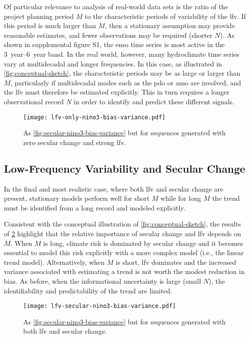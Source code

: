 \documentclass[
  draft,
  linenumbers
]{agujournal2019}
\begin{document}
Of particular relevance to analysis of real-world data sets is the ratio of the project planning period $M$ to the characteristic periods of variability of the \gls{lfv}.
If this period is much larger than $M$, then a stationary assumption may provide reasonable estimates, and fewer observations may be required (shorter $N$).
As shown in supplemental figure S1, the \gls{enso} time series is most active in the \SIrange{3}{6}{year} band.
In the real world, however, many hydroclimate time series vary at multidecadal and longer frequencies.
In this case, as illustrated in \cref{fig:conceptual-sketch}, the characteristic periods may be as large or larger than $M$, particularly if multidecadal modes such as the \gls{pdo} or \gls{amo} are involved, and the \gls{lfv} must therefore be estimated explicitly.
This in turn requires a longer observational record $N$ in order to identify and predict these different signals.

\begin{figure}
  \centering
  \texttt{[image: lfv-only-nino3-bias-variance.pdf]}
  \caption{
    As \cref{fig:secular-nino3-bias-variance} but for sequences generated with zero secular change and strong \gls{lfv}.
  }\label{fig:lfv-nino3-bias-variance}
\end{figure}

\subsection{Low-Frequency Variability and Secular Change}

In the final and most realistic case, where both \gls{lfv} and secular change are present, stationary models perform well for short $M$ while for long $M$ the trend must be identified from a long record and modeled explicitly.

Consistent with the conceptual illustration of \cref{fig:conceptual-sketch}, the results of \cref{fig:lfv-secular-nino3-bias-variance} highlight that the relative importance of secular change and \gls{lfv} depends on $M$.
When $M$ is long, climate risk is dominated by secular change and it becomes essential to model this risk explicitly with a more complex model (i.e.\@\xspace, the linear trend model).
Alternatively, when $M$ is short, \gls{lfv} dominates and the increased variance associated with estimating a trend is not worth the modest reduction in bias.
As before, when the informational uncertainty is large (small $N$), the identifiability and predictability of the trend are  limited.
\begin{figure}
  \centering
  \texttt{[image: lfv-secular-nino3-bias-variance.pdf]}
  \caption{
    As \cref{fig:secular-nino3-bias-variance} but for sequences generated with both \gls{lfv} and secular change.
  }\label{fig:lfv-secular-nino3-bias-variance}
\end{figure}
\end{document}
